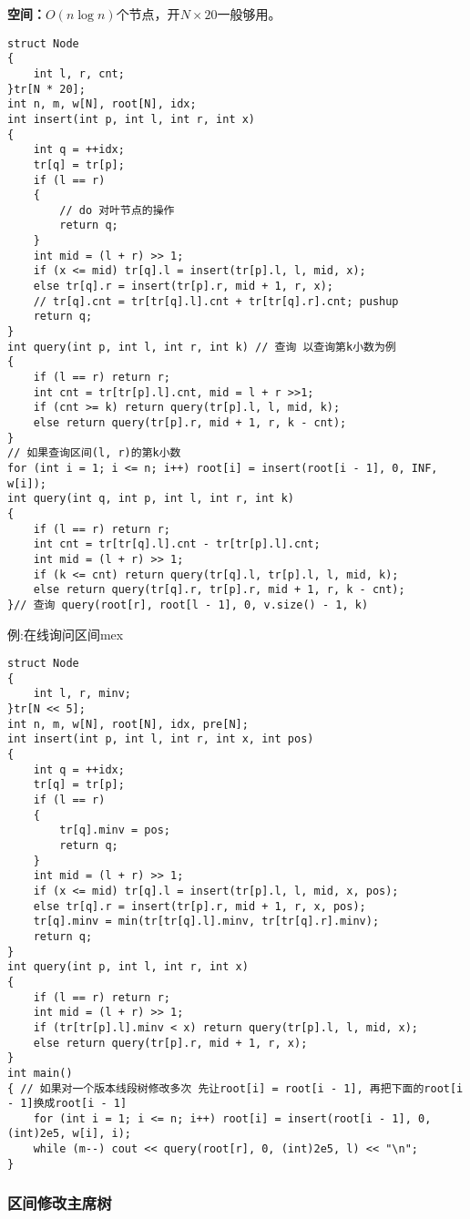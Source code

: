 \documentclass[a4paper, fontset=none]{ctexart}
\begin{document}
\textbf{空间：}$O(n\log n)$个节点，开$N \times 20$一般够用。
\begin{verbatim}
struct Node
{
    int l, r, cnt;
}tr[N * 20];
int n, m, w[N], root[N], idx;
int insert(int p, int l, int r, int x)
{
    int q = ++idx;
    tr[q] = tr[p];
    if (l == r)
    {
        // do 对叶节点的操作
        return q;
    }
    int mid = (l + r) >> 1;
    if (x <= mid) tr[q].l = insert(tr[p].l, l, mid, x);
    else tr[q].r = insert(tr[p].r, mid + 1, r, x);
    // tr[q].cnt = tr[tr[q].l].cnt + tr[tr[q].r].cnt; pushup
    return q;
}
int query(int p, int l, int r, int k) // 查询 以查询第k小数为例
{
    if (l == r) return r;
    int cnt = tr[tr[p].l].cnt, mid = l + r >>1;
    if (cnt >= k) return query(tr[p].l, l, mid, k);
    else return query(tr[p].r, mid + 1, r, k - cnt);
}
// 如果查询区间(l, r)的第k小数
for (int i = 1; i <= n; i++) root[i] = insert(root[i - 1], 0, INF, w[i]);
int query(int q, int p, int l, int r, int k)
{
    if (l == r) return r;
    int cnt = tr[tr[q].l].cnt - tr[tr[p].l].cnt;
    int mid = (l + r) >> 1;
    if (k <= cnt) return query(tr[q].l, tr[p].l, l, mid, k);
    else return query(tr[q].r, tr[p].r, mid + 1, r, k - cnt);
}// 查询 query(root[r], root[l - 1], 0, v.size() - 1, k)
\end{verbatim}

例:在线询问区间mex
\begin{verbatim}
struct Node
{
    int l, r, minv;
}tr[N << 5];
int n, m, w[N], root[N], idx, pre[N];
int insert(int p, int l, int r, int x, int pos)
{
    int q = ++idx;
    tr[q] = tr[p];
    if (l == r)
    {
        tr[q].minv = pos;
        return q;
    }
    int mid = (l + r) >> 1;
    if (x <= mid) tr[q].l = insert(tr[p].l, l, mid, x, pos);
    else tr[q].r = insert(tr[p].r, mid + 1, r, x, pos);
    tr[q].minv = min(tr[tr[q].l].minv, tr[tr[q].r].minv);
    return q;
}
int query(int p, int l, int r, int x)
{
    if (l == r) return r;
    int mid = (l + r) >> 1;
    if (tr[tr[p].l].minv < x) return query(tr[p].l, l, mid, x);
    else return query(tr[p].r, mid + 1, r, x);
}
int main()
{ // 如果对一个版本线段树修改多次 先让root[i] = root[i - 1], 再把下面的root[i - 1]换成root[i - 1]
    for (int i = 1; i <= n; i++) root[i] = insert(root[i - 1], 0, (int)2e5, w[i], i);
    while (m--) cout << query(root[r], 0, (int)2e5, l) << "\n";
}
\end{verbatim}
\subsubsection{区间修改主席树}
\end{document}
